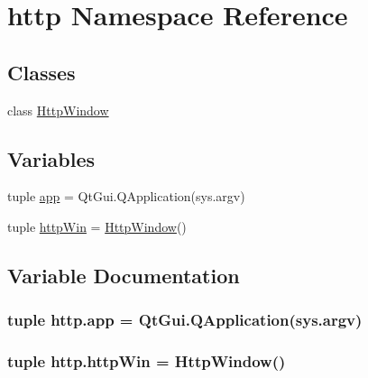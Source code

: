 \hypertarget{namespacehttp}{}\section{http Namespace Reference}
\label{namespacehttp}
\subsection*{Classes}
\begin{DoxyCompactItemize}
\item 
class \hyperlink{classhttp_1_1HttpWindow}{Http\+Window}
\end{DoxyCompactItemize}
\subsection*{Variables}
\begin{DoxyCompactItemize}
\item 
tuple \hyperlink{namespacehttp_a615909ab72bd92e36d480608d0f56e6e}{app} = Qt\+Gui.\+Q\+Application(sys.\+argv)
\item 
tuple \hyperlink{namespacehttp_ad3d1e96a453f07abd63c4da675b0d43c}{http\+Win} = \hyperlink{classhttp_1_1HttpWindow}{Http\+Window}()
\end{DoxyCompactItemize}


\subsection{Variable Documentation}
\hypertarget{namespacehttp_a615909ab72bd92e36d480608d0f56e6e}{}
\subsubsection[{app}]{\setlength{\rightskip}{0pt plus 5cm}tuple http.\+app = Qt\+Gui.\+Q\+Application(sys.\+argv)}\label{namespacehttp_a615909ab72bd92e36d480608d0f56e6e}
\hypertarget{namespacehttp_ad3d1e96a453f07abd63c4da675b0d43c}{}
\subsubsection[{http\+Win}]{\setlength{\rightskip}{0pt plus 5cm}tuple http.\+http\+Win = {\bf Http\+Window}()}\label{namespacehttp_ad3d1e96a453f07abd63c4da675b0d43c}
